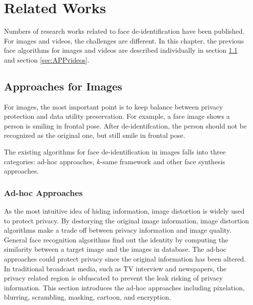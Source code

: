 \chapter{Related Works}
\label{chap:relatedWorks}
	Numbers of research works related to face de-identification have been 
	published. For images and videos, the challenges are different. 
	In this chapter, the previous face algorithms for images and videos 
	are described individually in section \ref{sec:APPimages} and section
	\ref{sec:APPvideos}. 

\section{Approaches for Images}
\label{sec:APPimages}
	For images, the most important point is to keep balance between privacy
	protection and data utility preservation. For example, a face image 
	shows a person is smiling in frontal pose. After de-identifcation, the 
	person should not be recognized as the original one, but still smile in
	frontal pose.

	The existing algorithms for face de-identification in images falls into
	three categories: ad-hoc approaches, $k$-same framework and  other face 
	synthesis approaches. 

	\subsection{Ad-hoc Approaches}
	
	As the most intuitive idea of hiding information, image distortion is widely
	used to protect privacy. By destorying the original image information, image
	distortion algorithms make a trade off between privacy information and image 
	quality. General face recognition algorithms find out the identity by 
	computing the similarity between a target image and the images in database. 
	The ad-hoc approaches could protect privacy since the original information 
	has been altered. In traditional broadcast media, such as TV interview and 
	newspapers, the privacy related region is obfuscated to prevent the leak risking 
	of privacy information. This section introduces the ad-hoc approaches including 
	pixelation, blurring, scrambling, masking, cartoon, and encryption. 

